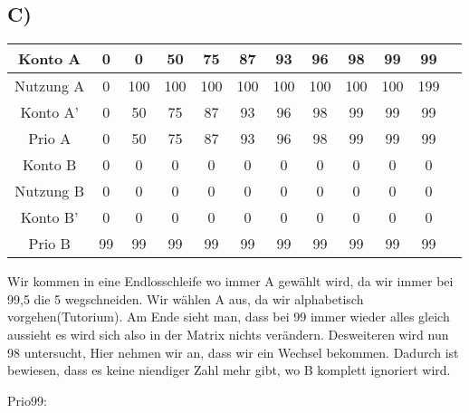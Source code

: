 \subsection{C)}
    \begin{center}
        \begin{tabular}{|c|c|c|c|c|c|c|c|c|c|c|c|}  \hline
            Konto A     &   0   &   0       &   50      &   75      &   87      &93     &   96      &   98      &   99      &   99  \\  \hline
            Nutzung A   &   0   &   100     &   100     &   100     &   100     &100    &   100     &   100     &   100     &   199 \\  \hline
            Konto A'    &   0   &   50      &   75      &   87      &   93      &96     &   98      &   99      &   99      &   99  \\  \hline
            Prio A      &   0   &   50      &   75      &   87      &   93      &96     &   98      &   99      &   99      &   99  \\  \hline\hline
            Konto B     &   0   &   0       &   0       &   0       &   0       &0      &   0       &   0       &   0       &   0   \\  \hline
            Nutzung B   &   0   &   0       &   0       &   0       &   0       &0      &   0       &   0       &   0       &   0   \\  \hline
            Konto B'    &   0   &   0       &   0       &   0       &   0       &0      &   0       &   0       &   0       &   0   \\  \hline
            Prio B      &   99  &   99      &   99      &   99      &   99      &99     &   99      &   99      &   99      &   99  \\  \hline
        \end{tabular}
    \end{center} \par\medskip

    Wir kommen in eine Endlosschleife wo immer A gewählt wird, da wir immer bei 99,5 die 5 wegschneiden.
    Wir wählen A aus, da wir alphabetisch vorgehen(Tutorium).
    Am Ende sieht man, dass bei 99 immer wieder alles gleich aussieht es wird sich also in der Matrix nichts verändern.
    Desweiteren wird nun 98 untersucht, Hier nehmen wir an, dass wir ein Wechsel bekommen.
    Dadurch ist bewiesen, dass es keine niendiger Zahl mehr gibt, wo B komplett ignoriert wird. \par

    Prio99: \par\medskip

